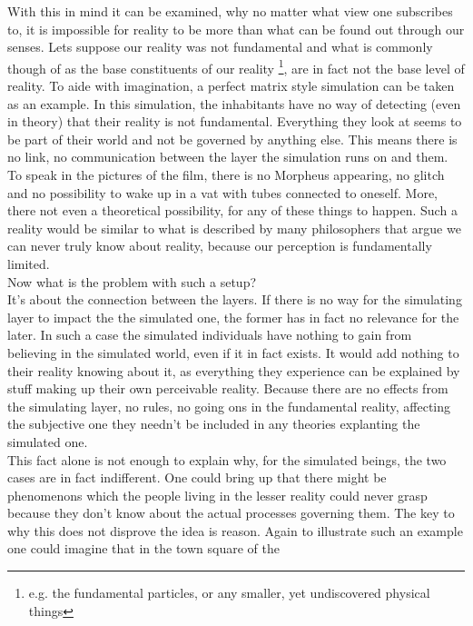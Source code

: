 \documentclass[fleqn,14pt]{article}
\begin{document}
With this in mind it can be examined, why no matter what view one subscribes to, it is impossible for reality
to be more than what can be found out through our senses.
Lets suppose our reality was not fundamental
and what is commonly though of as the base constituents of our reality \footnote{e.g. the fundamental
particles, or any smaller, yet
undiscovered physical things}, are in fact not the base level of reality. To aide with imagination, a perfect
matrix style simulation can be taken as an example. In this simulation, the inhabitants have no way of detecting
(even in theory) that their reality is not fundamental. Everything they look at seems to be part of their
world and not be governed by anything else. This means there is no link, no communication between the layer
the simulation runs on and them. To speak in the pictures of the film, there is no Morpheus appearing,
no glitch and no possibility to wake up in a vat with tubes connected to oneself. More, there not even a
theoretical possibility, for any of these things to happen. Such a reality would be similar to what is
described by many philosophers that argue we can never truly know about reality, because our perception
is fundamentally limited.\\
Now what is the problem with such a setup?\\
It's about the connection between the layers. If there is no way for the simulating layer to impact the
the simulated one, the former has in fact no relevance for the later. In such a case the simulated
individuals have nothing to gain from believing in the simulated world, even if it in fact exists. It would
add nothing to their reality knowing about it, as everything they experience can be explained by stuff
making up their own perceivable reality. Because there are no effects from the simulating layer, no rules,
no going ons in
the fundamental reality, affecting the subjective one they needn't be included in any theories explanting
the simulated one. \\
This fact alone is not enough to explain why, for the simulated beings, the two cases are in fact indifferent.
One could bring up that there might be phenomenons which the people living in the lesser reality could never
grasp because they don't know about the actual processes governing them. The key to why this does not disprove
the idea is reason. Again to illustrate such an example one could imagine that in the town square of the
\end{document}
